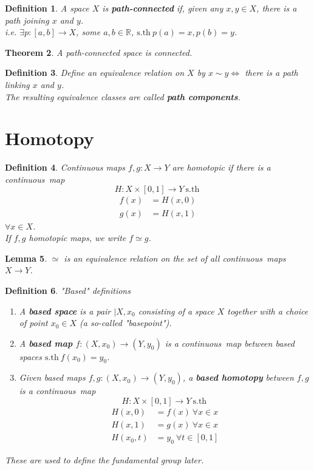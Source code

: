 \documentclass{article}
\newcommand{\sth}{\mathrm{s.th}\ }
\newcommand{\R}{\mathbb{R}}
\newcommand{\cts}{continuous\ }
\newtheorem{theorem}{Theorem}[section]
\newtheorem{lemma}[theorem]{Lemma}
\newtheorem{definition}[theorem]{Definition}
\theoremstyle{remark}
\theoremstyle{example}
\theoremstyle{examples}
\begin{document}
	\begin{definition}
		A space $X$ is \textbf{path-connected} if,
		given any $x,y \in X$, there is a path joining $x$ and $y$.\\
		i.e. $\exists p:[a,b] \to X$, some $a,b \in \R$, $\sth p(a)=x, p(b)=y$.
	\end{definition}

	\begin{theorem}
		A path-connected space is connected.
	\end{theorem}

	\begin{definition}
		Define an equivalence relation on $X$ by $x \sim y \iff$
		there is a path linking $x$ and $y$.\\
		The resulting equivalence classes are called \textbf{path components}.
	\end{definition}

	\pagebreak
	\section{Homotopy}
	\begin{definition}
		Continuous maps $f,g:X \to Y$ are homotopic if there is a \cts map
		\[H:X \times [0,1] \to Y\ \sth \]
		\begin{align*}
			f(x) & =H(x,0)\\
			g(x) &= H(x,1)
		\end{align*}
		$\forall x \in X$.\\
		If $f,g$ homotopic maps, we write $f \simeq g$.
	\end{definition}

	\begin{lemma}
		$\simeq$ is an equivalence relation on the set of all \cts maps
		$X \to Y$.
	\end{lemma}
	\pagebreak
	\begin{definition}
		"Based" definitions
		\begin{enumerate}
			\item A \textbf{based space} is a pair $|X,x_0$ consisting
			of a space $X$ together with a choice of point $x_0 \in X$
			(a so-called "basepoint").
			\item A \textbf{based map} $f:(X,x_0) \to (Y,y_0)$ is
			a \cts map between based spaces $\sth f(x_0)=y_0$.
			\item Given based maps $f,g:(X,x_0) \to (Y,y_0)$,
			a \textbf{based homotopy} between $f,g$ is a \cts map
			\[H: X \times [0,1] \to Y\ \sth\]
			\begin{align*}
				H(x,0) &=f(x)\ \forall x \in x\\
				H(x,1) &=g(x)\ \forall x \in x\\
				H(x_0,t) &= y_0\ \forall t \in [0,1]
			\end{align*}
		\end{enumerate}
		These are used to define the fundamental group later.
	\end{definition}
\end{document}
